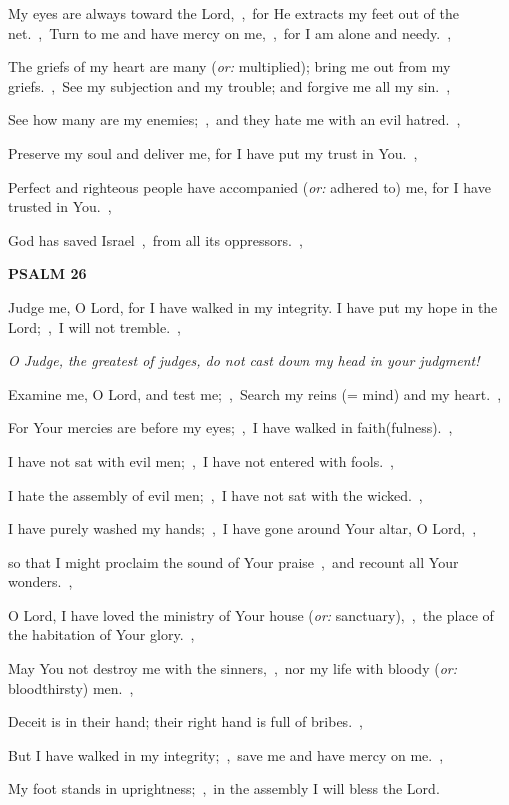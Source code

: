 \documentclass[12pt,twoside,a5paper]{article}
\newcommand{\psalm}[1]{\textbf{PSALM {#1}}\nopagebreak}
\newcommand{\qanona}[1]{{\liturgicalhint{Qanona.} \emph{#1}}}
\newcommand{\translationoption}[1]{\emph{or:} #1}
\begin{document}
\begin{normalparskip}
  My eyes are always toward the Lord,~\sep\ for He extracts my feet out of the net.~\sep\ Turn to me and have mercy on me,~\sep\ for I am alone and needy.~\sep

  The griefs of my heart are many (\translationoption{multiplied}); bring me out from my griefs.~\sep\ See my subjection and my trouble; and forgive me all my sin.~\sep

  See how many are my enemies;~\sep\ and they hate me with an evil hatred.~\sep

  Preserve my soul and deliver me, for I have put my trust in You.~\sep

  Perfect and righteous people have accompanied (\translationoption{adhered to}) me, for I have trusted in You.~\sep

  God has saved Israel~\sep\ from all its oppressors.~\sep
\end{normalparskip}

\psalm{26}

\begin{normalparskip}
  Judge me, O Lord, for I have walked in my integrity. I have put my hope in the Lord;~\sep\ I will not tremble.~\sep

  \qanona{O Judge, the greatest of judges, do not cast down my head in your judgment!}

  Examine me, O Lord, and test me;~\sep\ Search my reins (= mind) and my heart.~\sep

  For Your mercies are before my eyes;~\sep\ I have walked in faith(fulness).~\sep

  I have not sat with evil men;~\sep\ I have not entered with fools.~\sep

  I hate the assembly of evil men;~\sep\ I have not sat with the wicked.~\sep

  I have purely washed my hands;~\sep\ I have gone around Your altar, O Lord,~\sep

  so that I might proclaim the sound of Your praise~\sep\ and recount all Your wonders.~\sep

  O Lord, I have loved the ministry of Your house (\translationoption{sanctuary}),~\sep\ the place of the habitation of Your glory.~\sep

  May You not destroy me with the sinners,~\sep\ nor my life with bloody (\translationoption{bloodthirsty}) men.~\sep

  Deceit is in their hand; their right hand is full of bribes.~\sep

  But I have walked in my integrity;~\sep\ save me and have mercy on me.~\sep

  My foot stands in uprightness;~\sep\ in the assembly I will bless the Lord.
\end{normalparskip}
\end{document}
